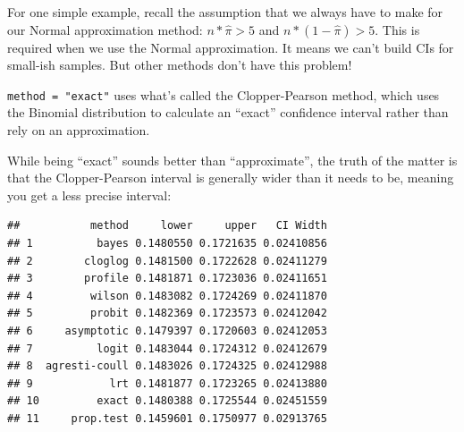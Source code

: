 \documentclass[
]{book}
\newenvironment{Shaded}{\begin{snugshade}}{\end{snugshade}}
\newcommand{\DataTypeTok}[1]{\textcolor[rgb]{0.13,0.29,0.53}{#1}}
\newcommand{\DecValTok}[1]{\textcolor[rgb]{0.00,0.00,0.81}{#1}}
\newcommand{\FloatTok}[1]{\textcolor[rgb]{0.00,0.00,0.81}{#1}}
\newcommand{\KeywordTok}[1]{\textcolor[rgb]{0.13,0.29,0.53}{\textbf{#1}}}
\newcommand{\NormalTok}[1]{#1}
\newcommand{\OperatorTok}[1]{\textcolor[rgb]{0.81,0.36,0.00}{\textbf{#1}}}
\newcommand{\StringTok}[1]{\textcolor[rgb]{0.31,0.60,0.02}{#1}}
\theoremstyle{definition}
\theoremstyle{definition}
\theoremstyle{definition}
\theoremstyle{remark}
\begin{document}
For one simple example, recall the assumption that we always have to make for our Normal approximation method: \(n * \hat\pi > 5\) and \(n * (1 - \hat\pi) > 5\). This is required when we use the Normal approximation. It means we can't build CIs for small-ish samples. But other methods don't have this problem!

\texttt{method\ =\ "exact"} uses what's called the Clopper-Pearson method, which uses the Binomial distribution to calculate an ``exact'' confidence interval rather than rely on an approximation.

While being ``exact'' sounds better than ``approximate'', the truth of the matter is that the Clopper-Pearson interval is generally wider than it needs to be, meaning you get a less precise interval:

\begin{Shaded}
\end{Shaded}

\begin{verbatim}
##           method     lower     upper   CI Width
## 1          bayes 0.1480550 0.1721635 0.02410856
## 2        cloglog 0.1481500 0.1722628 0.02411279
## 3        profile 0.1481871 0.1723036 0.02411651
## 4         wilson 0.1483082 0.1724269 0.02411870
## 5         probit 0.1482369 0.1723573 0.02412042
## 6     asymptotic 0.1479397 0.1720603 0.02412053
## 7          logit 0.1483044 0.1724312 0.02412679
## 8  agresti-coull 0.1483026 0.1724325 0.02412988
## 9            lrt 0.1481877 0.1723265 0.02413880
## 10         exact 0.1480388 0.1725544 0.02451559
## 11     prop.test 0.1459601 0.1750977 0.02913765
\end{verbatim}
\end{document}
